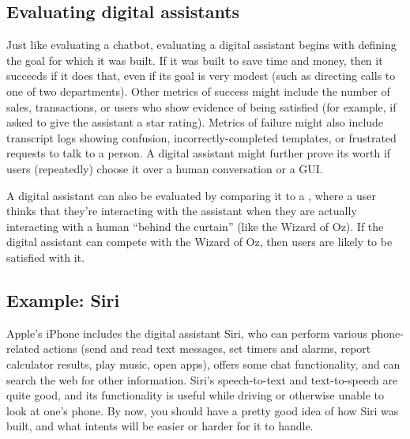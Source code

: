 


\subsection{Evaluating digital assistants}

Just like evaluating a chatbot, evaluating a digital assistant begins with defining the goal for which it was built.  If it was built to save time and money, then it succeeds if it does that, even if its goal is very modest (such as directing calls to one of two departments).  Other metrics of success might include the number of sales, transactions, or users who show evidence of being satisfied (for example, if asked to give the assistant a star rating).  Metrics of failure might also include transcript logs showing confusion, incorrectly-completed templates, or frustrated requests to talk to a person.  A digital assistant might further prove its worth if users (repeatedly) choose it over a human conversation or a GUI.

A digital assistant can also be evaluated by comparing it to a , where a user thinks that they're interacting with the assistant when they are actually interacting with a human ``behind the curtain'' (like the Wizard of Oz).  If the digital assistant can compete with the Wizard of Oz, then users are likely to be satisfied with it.




% 


\subsection{Example: Siri}

Apple's iPhone includes the digital assistant Siri, who can perform various phone-related actions (send and read text messages, set timers and alarms, report calculator results, play music, open apps), offers some chat functionality, and can search the web for other information.  Siri's speech-to-text and text-to-speech are quite good, and its functionality is useful while driving or otherwise unable to look at one's phone.    By now, you should have a pretty good idea of how Siri was built, and what intents will be easier or harder for it to handle.


